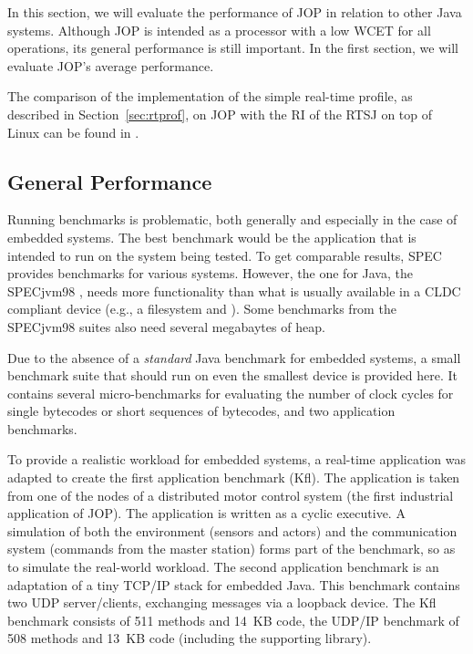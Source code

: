 In this section, we will evaluate the performance of JOP in relation
to other Java systems. Although JOP is intended as a processor with
a low WCET for all operations, its general performance is still
important. In the first section, we will evaluate JOP's average
performance.


The comparison of the implementation of the simple real-time profile,
as described in Section~\ref{sec:rtprof}, on JOP with the RI of the
RTSJ on top of Linux can be found in \cite{jop:rtjava}.

\subsection{General Performance}

Running benchmarks is problematic, both generally and especially in
the case of embedded systems. The best benchmark would be the
application that is intended to run on the system being tested. To
get comparable results, SPEC provides benchmarks for various systems.
However, the one for Java, the SPECjvm98 \cite{SPECJvm98}, needs more
functionality than what is usually available in a CLDC compliant
device (e.g., a filesystem and ). Some benchmarks from
the SPECjvm98 suites also need several megabaytes of heap.

Due to the absence of a \emph{standard} Java benchmark for embedded
systems, a small benchmark suite that should run on even the
smallest device is provided here. It contains several
micro-benchmarks for evaluating the number of clock cycles for
single bytecodes or short sequences of bytecodes, and two
application benchmarks.

To provide a realistic workload for embedded systems, a real-time
application was adapted to create the first application benchmark
(Kfl). The application is taken from one of the nodes of a
distributed motor control system \cite{jop:wises03} (the first
industrial application of JOP). The application is written as a
cyclic executive. A simulation of both the environment (sensors and
actors) and the communication system (commands from the master
station) forms part of the benchmark, so as to simulate the
real-world workload. The second application benchmark is an
adaptation of a tiny TCP/IP stack for embedded Java. This benchmark
contains two UDP server/clients, exchanging messages via a loopback
device. The Kfl benchmark consists of 511 methods and 14~KB code,
the UDP/IP benchmark of 508 methods and 13~KB code (including the
supporting library).

